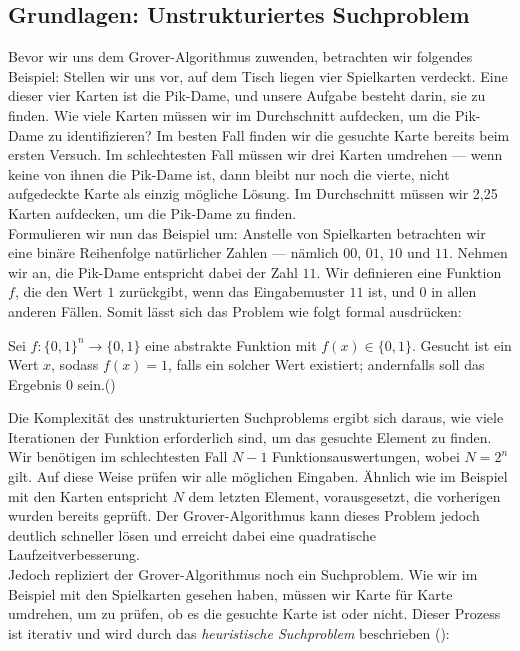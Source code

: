 \subsection{Grundlagen: Unstrukturiertes Suchproblem}
Bevor wir uns dem Grover-Algorithmus zuwenden, betrachten wir folgendes Beispiel: Stellen wir uns vor, auf dem Tisch liegen vier Spielkarten verdeckt. Eine dieser vier Karten ist die Pik-Dame, und unsere Aufgabe besteht darin, sie zu finden. Wie viele Karten müssen wir im Durchschnitt aufdecken, um die Pik-Dame zu identifizieren? Im besten Fall finden wir die gesuchte Karte bereits beim ersten Versuch. Im schlechtesten Fall müssen wir drei Karten umdrehen — wenn keine von ihnen die Pik-Dame ist, dann bleibt nur noch die vierte, nicht aufgedeckte Karte als einzig mögliche Lösung. Im Durchschnitt müssen wir 2{,}25 Karten aufdecken, um die Pik-Dame zu finden.\\

Formulieren wir nun das Beispiel um: Anstelle von Spielkarten betrachten wir eine binäre Reihenfolge natürlicher Zahlen — nämlich $00$, $01$, $10$ und $11$. Nehmen wir an, die Pik-Dame entspricht dabei der Zahl $11$. Wir definieren eine Funktion $f$, die den Wert $1$ zurückgibt, wenn das Eingabemuster $11$ ist, und $0$ in allen anderen Fällen. Somit lässt sich das Problem wie folgt formal ausdrücken:

\begin{definition}
Sei $f\colon \{0, 1\}^n \rightarrow \{0, 1\}$ eine abstrakte Funktion mit $f(x) \in \{0, 1\}$. Gesucht ist ein Wert $x$, sodass $f(x) = 1$, falls ein solcher Wert existiert; andernfalls soll das Ergebnis $0$ sein.(\cite{montanaro_quantum_2016})
\end{definition}

Die Komplexität des unstrukturierten Suchproblems ergibt sich daraus, wie viele Iterationen der Funktion erforderlich sind, um das gesuchte Element zu finden. Wir benötigen im schlechtesten Fall $N - 1$ Funktionsauswertungen, wobei $N = 2^n$ gilt. Auf diese Weise prüfen wir alle möglichen Eingaben. Ähnlich wie im Beispiel mit den Karten entspricht $N$ dem letzten Element, vorausgesetzt, die vorherigen wurden bereits geprüft. Der Grover-Algorithmus kann dieses Problem jedoch deutlich schneller lösen und erreicht dabei eine quadratische Laufzeitverbesserung.\\

Jedoch repliziert der Grover-Algorithmus noch ein Suchproblem. Wie wir im Beispiel mit den Spielkarten gesehen haben, müssen wir Karte für Karte umdrehen, um zu prüfen, ob es die gesuchte Karte ist oder nicht. Dieser Prozess ist iterativ und wird durch das \textit{heuristische Suchproblem} beschrieben (\cite{montanaro_quantum_2016}):

